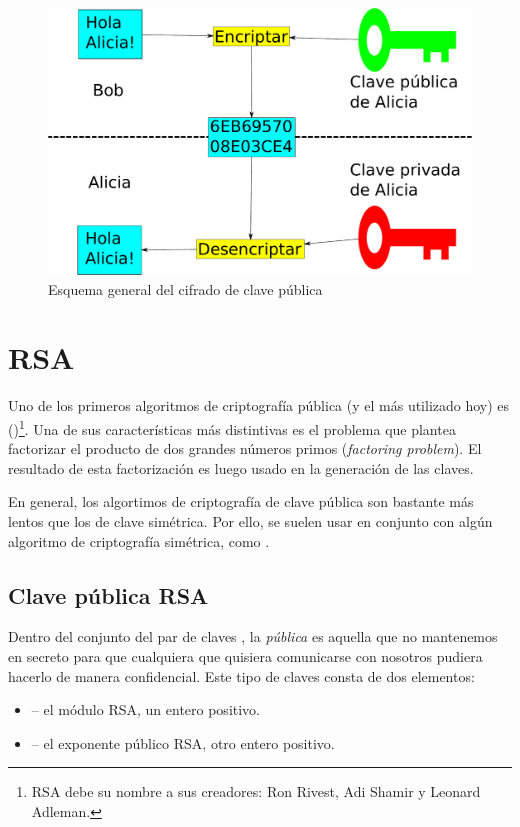 \begin{figure}[ht]
  \centering
  \includegraphics[scale=0.3]{Figures/PublicKeyEncryption}
  \decoRule
  \caption[Cifrado de clave pública (Esquema)]{Esquema general del cifrado de clave pública}
  \label{fig:PublicKeyEncryption}
\end{figure}


\section{RSA}

Uno de los primeros algoritmos de criptografía pública (y el más utilizado hoy) es  ()\footnote{RSA debe su nombre a sus creadores: Ron Rivest, Adi Shamir y Leonard Adleman.}.
Una de sus características más distintivas es el problema que plantea factorizar el producto de dos grandes números primos (\emph{factoring problem}).
El resultado de esta factorización es luego usado en la generación de las claves.

En general, los algortimos de criptografía de clave pública son bastante más lentos que los de clave simétrica.
Por ello, se suelen usar en conjunto con algún algoritmo de criptografía simétrica, como . \emph{\parencite{Reference9}}

\subsection{Clave pública RSA}

Dentro del conjunto del par de claves , la \emph{pública} es aquella que no mantenemos en secreto para que cualquiera que quisiera comunicarse con nosotros pudiera hacerlo de manera confidencial.
Este tipo de claves consta de dos elementos:
\begin{itemize}
  \item {} -- el módulo RSA, un entero positivo.
  \item {} -- el exponente público RSA, otro entero positivo.
\end{itemize}

